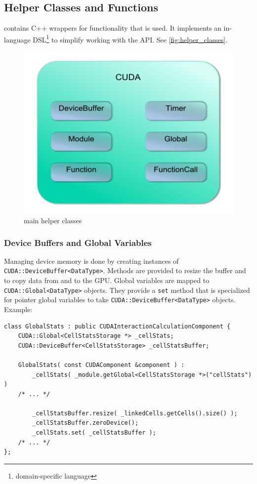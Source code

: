 \subsection{\cuda{} Helper Classes and Functions}
 contains C++ wrappers for \cuda{} functionality that is used.
It implements an in-language DSL\footnote{domain-specific language} to simplify working with the \cuda{} API. See \autoref{fig:helper_classes}.

\begin{figure}
\includegraphics{figures/helpers_classes.pdf}
\centering
\caption{main \cuda{} helper classes}
\label{fig:helper_classes}
\end{figure}

\subsubsection{Device Buffers and Global Variables}
Managing device memory is done by creating instances of \lstinline!CUDA::DeviceBuffer<DataType>!. Methods are provided to resize the buffer and to copy data from and to the GPU.
Global variables are mapped to \lstinline!CUDA::Global<DataType>! objects. They provide a \lstinline!set! method that is specialized for pointer global variables to take \lstinline!CUDA::DeviceBuffer<DataType>! objects.
Example:
\begin{lstlisting}[label=cudamemoryhelpers,caption=\cuda{} helper classes for device memory and globals]
class GlobalStats : public CUDAInteractionCalculationComponent {
	CUDA::Global<CellStatsStorage *> _cellStats;
	CUDA::DeviceBuffer<CellStatsStorage> _cellStatsBuffer;
	
	GlobalStats( const CUDAComponent &component ) :
		_cellStats( _module.getGlobal<CellStatsStorage *>("cellStats") )
	/* ... */
	
		_cellStatsBuffer.resize( _linkedCells.getCells().size() );
		_cellStatsBuffer.zeroDevice();
		_cellStats.set( _cellStatsBuffer );		
	/* ... */		
};	
\end{lstlisting}

